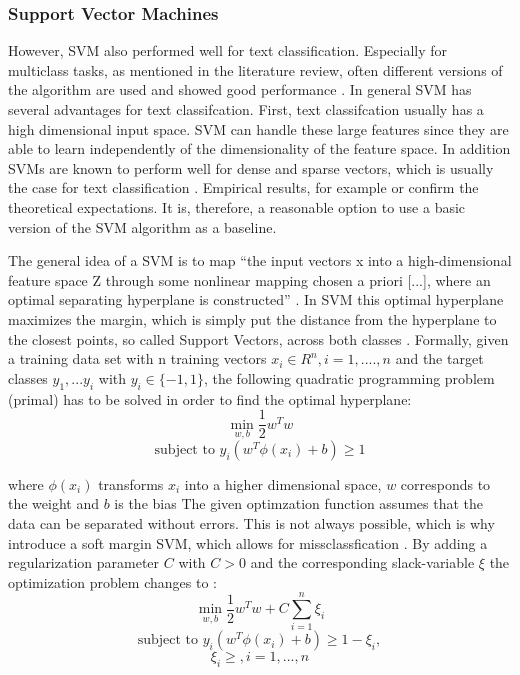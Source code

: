 \documentclass[12pt, a4paper, titlepage]{article}
\begin{document}
\subsubsection{Support Vector Machines}
However, \ac{SVM} also performed well for text classification. Especially for multiclass tasks, as mentioned in the literature review, often different versions of the algorithm are used and showed good performance \citep{Aiolli2005,Angulo2003,Benabdeslem2006,Guo2015,Mayoraz1999,Tang2019,Tomar2015}. In general \ac{SVM} has several advantages for text classifcation. First, text classifcation usually has a high dimensional input space. \ac{SVM} can handle these large features since they are able to learn independently of the dimensionality of the feature space. In addition \ac{SVM}s are known to perform well for dense and sparse vectors, which is usually the case for text classification \citep{Joachims1998}. Empirical results, for example \citet{Joachims1998} or \cite{Liu2010} confirm the theoretical expectations. It is, therefore, a reasonable option to use a basic version of the \ac{SVM} algorithm as a baseline. 

The general idea of a \ac{SVM} is to map ``the input vectors x into a high-dimensional feature space Z through some nonlinear mapping chosen a priori [...], where an optimal separating hyperplane is constructed'' \citep[138]{Vapnik2000}. In \ac{SVM} this optimal hyperplane maximizes the margin, which is simply put the distance from the hyperplane to the closest points, so called Support Vectors, across both classes \citep{Han2012}. Formally, given a training data set with n training vectors $x_i \in R^n, i = 1,....,n$ and the target classes $y_1,...y_i$ with $y_i \in \{-1, 1\}$, the following quadratic programming problem (primal) has to be solved in order to find the optimal hyperplane:
\[\min_{w,b} \frac{1}{2}w^{T}w \] 
\[\text{subject to } y_i(w^T\phi(x_i)+b) \geq 1\]

where $\phi(x_i)$ transforms $x_i$ into a higher dimensional space, $w$ corresponds to the weight and $b$ is the bias \citep{Chang2001,Jordan2006}
The given optimzation function assumes that the data can be separated without errors. This is not always possible, which is why \cite{Cortes1995} introduce a soft margin \ac{SVM}, which allows for missclassfication \citep{Vapnik2000}.
By adding a regularization parameter $C$ with $C > 0$ and the corresponding slack-variable $\xi$ the optimization problem changes to \citep{Chang2001, Han2012}: 
\[\min_{w,b} \frac{1}{2}w^{T}w + C \sum_{i=1}^n \xi_i \] 
\[\text{subject to } y_i(w^T\phi(x_i)+b) \geq 1 - \xi_i, \] 
\[\xi_i \geq, i = 1,...,n\]
\end{document}
